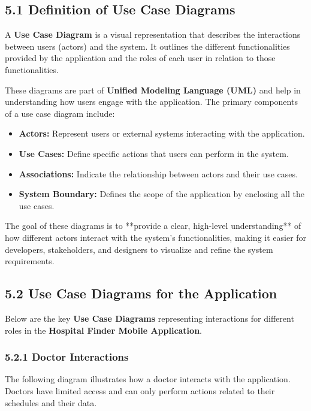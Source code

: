 \documentclass[12pt]{report}
\begin{document}
\subsection*{\textbf{5.1 Definition of Use Case Diagrams}}


\noindent A \textbf{Use Case Diagram} is a visual representation that describes the interactions between users (actors) and the system. It outlines the different functionalities provided by the application and the roles of each user in relation to those functionalities.

\noindent These diagrams are part of \textbf{Unified Modeling Language (UML)} and help in understanding how users engage with the application. The primary components of a use case diagram include:

\begin{itemize}
	\item \textbf{Actors:} Represent users or external systems interacting with the application.
	\item \textbf{Use Cases:} Define specific actions that users can perform in the system.
	\item \textbf{Associations:} Indicate the relationship between actors and their use cases.
	\item \textbf{System Boundary:} Defines the scope of the application by enclosing all the use cases.
\end{itemize}

\noindent The goal of these diagrams is to **provide a clear, high-level understanding** of how different actors interact with the system’s functionalities, making it easier for developers, stakeholders, and designers to visualize and refine the system requirements.

\subsection*{\textbf{5.2 Use Case Diagrams for the Application}}


\noindent Below are the key \textbf{Use Case Diagrams} representing interactions for different roles in the \textbf{Hospital Finder Mobile Application}.

\newpage
\subsubsection*{\textbf{5.2.1 Doctor Interactions}}
The following diagram illustrates how a doctor interacts with the application. Doctors have limited access and can only perform actions related to their schedules and their data.
\end{document}

